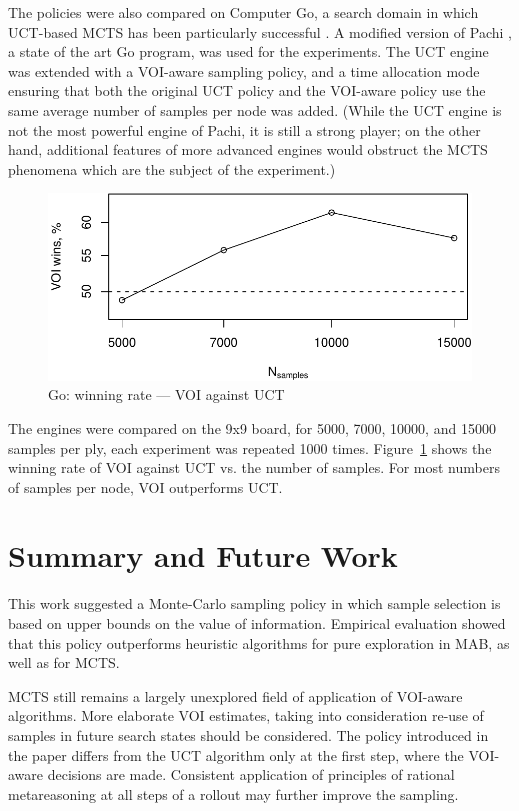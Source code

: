 \documentclass{ecai2012}
\begin{document}
The policies were also compared on Computer Go, a  search domain
in which UCT-based MCTS has been particularly successful
\cite{Gelly.mogo}. A modified version of Pachi \cite{Braudis.pachi}, a state of the art
Go program, was used for the experiments. The UCT engine was extended
with a VOI-aware sampling policy, and a time allocation mode ensuring
that both the original UCT policy and the VOI-aware policy use the
same average number of samples per node was added. (While the UCT
engine is not the most powerful engine of Pachi, it is still a strong
player; on the other hand, additional features of more advanced
engines would obstruct the MCTS phenomena which are the subject of
the experiment.)
\begin{figure}[h!]
\centering
\includegraphics[scale=0.53]{vct-wins.pdf}
\vspace{-16pt}
\caption{Go: winning rate --- VOI against UCT}
\label{fig:vct-against-uct}
\vspace{-20pt}
\end{figure}
The engines were compared on the 9x9 board, for 5000, 7000, 10000, and
15000 samples per ply, each experiment was repeated
1000 times. Figure~\ref{fig:vct-against-uct}
shows the winning rate of VOI against UCT vs. the number of
samples. For most numbers of samples per node, VOI outperforms UCT.

\section{Summary and Future Work}

This work suggested a Monte-Carlo sampling policy in which sample
selection is based on upper bounds on the value of
information. Empirical evaluation showed that this policy outperforms
heuristic algorithms for pure exploration in MAB, as well as for MCTS.

MCTS still remains a largely unexplored field of
application of VOI-aware algorithms. More elaborate VOI estimates,
taking into consideration re-use of samples in future search states
should be considered. The policy introduced in the paper differs from
the UCT algorithm only at the first step, where the VOI-aware
decisions are made. Consistent application of principles of rational
metareasoning at all steps of a rollout may further improve the
sampling.



\end{document}
